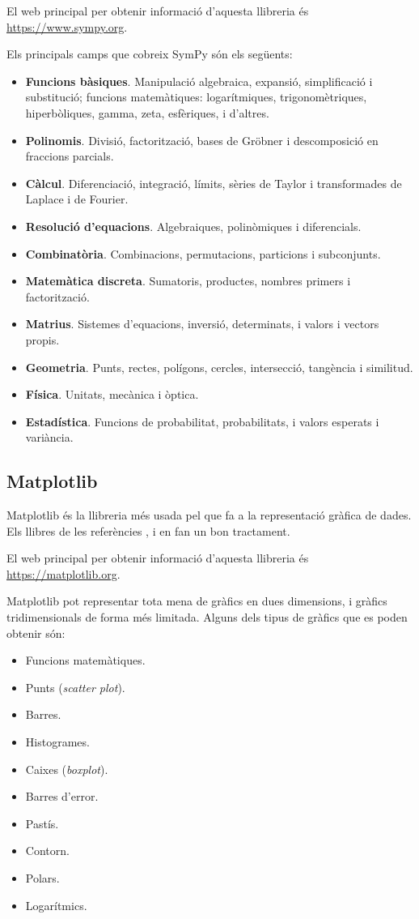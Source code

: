 El  web principal per obtenir informació d'aquesta llibreria és
\href{https://www.sympy.org/}{https:/\!\!/www.sympy.org}.

Els principals camps que cobreix SymPy són els següents:
\begin{itemize}
	\item \textbf{Funcions bàsiques}. Manipulació algebraica, expansió, simplificació i substitució; funcions matemàtiques: logarítmiques, trigonomètriques, hiperbòliques, gamma, zeta, esfèriques,  i d'altres.
	\item \textbf{Polinomis}. Divisió, factorització, 	 bases de Gröbner i descomposició en fraccions parcials.
	\item \textbf{Càlcul}. Diferenciació, integració, límits, sèries de Taylor i transformades de Laplace i de Fourier.
	\item \textbf{Resolució d'equacions}. Algebraiques, polinòmiques i diferencials.
	\item \textbf{Combinatòria}. Combinacions, permutacions, particions i subconjunts.
	\item \textbf{Matemàtica discreta}. Sumatoris, productes, nombres primers i factorització.
	\item \textbf{Matrius}. Sistemes d'equacions, inversió, determinats, i valors i vectors propis.
	\item \textbf{Geometria}. Punts, rectes, polígons, cercles, intersecció, tangència i similitud.
	\item \textbf{Física}. Unitats, mecànica i òptica.
	\item \textbf{Estadística}. Funcions de probabilitat, probabilitats, i valors esperats  i variància.
\end{itemize}


\subsection{Matplotlib}

Matplotlib és la llibreria més usada pel que fa a la representació gràfica de dades. Els llibres de les referències \cite{JOH}, \cite{HIL} i \cite{VAN} en fan un bon tractament.

El  web principal per obtenir informació d'aquesta llibreria és \href{https://matplotlib.org/}{https:/\!\!/matplotlib.org}.

Matplotlib pot representar tota mena de gràfics en dues dimensions, i gràfics  tridimensionals de forma més limitada. Alguns dels tipus de gràfics que es poden obtenir són:
\begin{itemize}
	\item Funcions matemàtiques.
	\item Punts (\textit{scatter plot}).
	\item Barres.
	\item Histogrames.
	\item Caixes (\textit{boxplot}).
	\item Barres d'error.
	\item Pastís.
	\item Contorn.
	\item Polars.
	\item Logarítmics.
\end{itemize}

